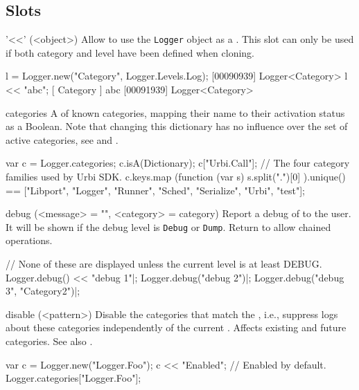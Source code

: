 \subsection{Slots}

\begin{urbiscriptapi}
\item['<<'](<object>)%
  Allow to use the \lstinline|Logger| object as a . This
  slot can only be used if both category and level have been defined when
  cloning.

\begin{urbiunchecked}
l = Logger.new("Category", Logger.Levels.Log);
[00090939] Logger<Category>
l << "abc";
[       Category        ] abc
[00091939] Logger<Category>
\end{urbiunchecked}


\item[categories]%
  A  of known categories, mapping their name to their
  activation status as a Boolean.  Note that changing this dictionary has no
  influence over the set of active categories, see  and
  .
\begin{urbiassert}[firstnumber=1]
var c = Logger.categories;
c.isA(Dictionary);
c["Urbi.Call"];
// The four category families used by Urbi SDK.
c.keys.map (function (var s) { s.split(".")[0] }).unique()
  == ["Libport", "Logger", "Runner", "Sched", "Serialize", "Urbi", "test"];
\end{urbiassert}


\item[debug](<message> = "", <category> = category)%
  Report a debug  of  to the user. It will be
  shown if the debug level is \lstinline|Debug| or \lstinline|Dump|. Return
  \this to allow chained operations.
\begin{urbiunchecked}
// None of these are displayed unless the current level is at least DEBUG.
Logger.debug() << "debug 1"|;
Logger.debug("debug 2")|;
Logger.debug("debug 3", "Category2")|;
\end{urbiunchecked}


\item[disable](<pattern>)%
  Disable the categories that match the , i.e., suppress logs
  about these categories independently of the current .
  Affects existing and future categories.  See also .
\begin{urbiassert}
var c = Logger.new("Logger.Foo");
c << "Enabled";
// Enabled by default.
Logger.categories["Logger.Foo"];


\end{urbiassert}
\end{urbiscriptapi}
